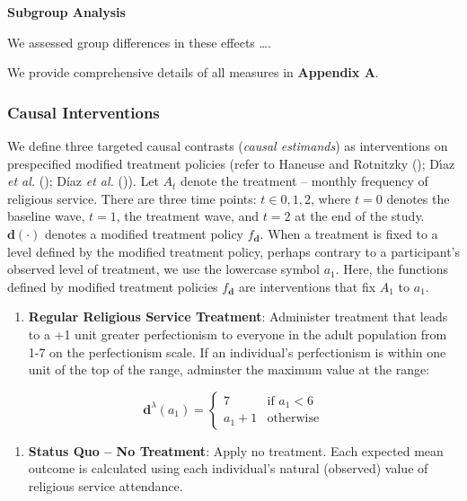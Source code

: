 \documentclass[
  single column]{article}
\providecommand{\tightlist}{%
  \setlength{\itemsep}{0pt}\setlength{\parskip}{0pt}}\usepackage{longtable,booktabs,array}
\begin{document}
\textbf{Subgroup Analysis}

We assessed group differences in these effects \ldots.

We provide comprehensive details of all measures in \textbf{Appendix A}.

\subsubsection{Causal Interventions}\label{causal-interventions}

We define three targeted causal contrasts (\emph{causal estimands}) as
interventions on prespecified modified treatment policies (refer to
Haneuse and Rotnitzky (); Dı́az
\emph{et al.} (); Díaz
\emph{et al.} ()). Let \(A_t\) denote
the treatment -- monthly frequency of religious service. There are three
time points: \(t\in{0,1,2}\), where \(t=0\) denotes the baseline wave,
\(t=1\), the treatment wave, and \(t=2\) at the end of the study.
\(\mathbf{d}(\cdot)\) denotes a modified treatment policy
\(f_\mathbf{d}\). When a treatment is fixed to a level defined by the
modified treatment policy, perhaps contrary to a participant's observed
level of treatment, we use the lowercase symbol \(a_1\). Here, the
functions defined by modified treatment policies \(f_\mathbf{d}\) are
interventions that fix \(A_1\) to \(a_1\).

\begin{enumerate}
\def\labelenumi{\arabic{enumi}.}
\tightlist
\item
  \textbf{Regular Religious Service Treatment}: Administer treatment
  that leads to a +1 unit greater perfectionism to everyone in the adult
  population from 1-7 on the perfectionism scale. If an individual's
  perfectionism is within one unit of the top of the range, adminster
  the maximum value at the range:
\end{enumerate}

\[
\mathbf{d}^\lambda (a_1) = \begin{cases} 7 & \text{if } a_1 <  6 \\ 
a_1 + 1 & \text{otherwise} \end{cases}
\]

\begin{enumerate}
\def\labelenumi{\arabic{enumi}.}
\setcounter{enumi}{2}
\tightlist
\item
  \textbf{Status Quo -- No Treatment}: Apply no treatment. Each expected
  mean outcome is calculated using each individual's natural (observed)
  value of religious service attendance.
\end{enumerate}
\end{document}
